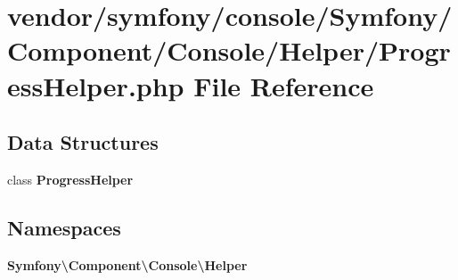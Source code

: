 \section{vendor/symfony/console/\+Symfony/\+Component/\+Console/\+Helper/\+Progress\+Helper.php File Reference}
\label{_progress_helper_8php}
\subsection*{Data Structures}
\begin{DoxyCompactItemize}
\item 
class {\bf Progress\+Helper}
\end{DoxyCompactItemize}
\subsection*{Namespaces}
\begin{DoxyCompactItemize}
\item 
 {\bf Symfony\textbackslash{}\+Component\textbackslash{}\+Console\textbackslash{}\+Helper}
\end{DoxyCompactItemize}
